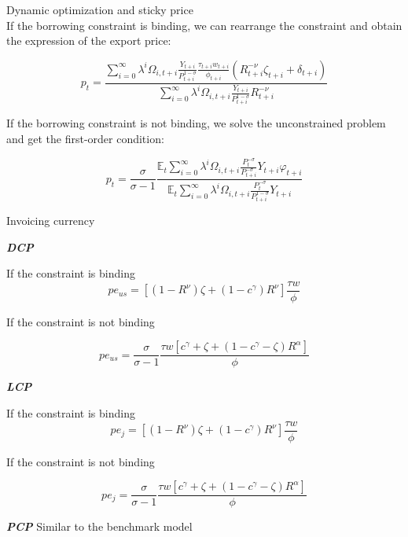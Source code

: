 \documentclass[10pt]{beamer}
\begin{document}
\begin{frame}[label=appendix_model_extension]{Dynamic optimization and sticky price} 
\hyperlink{model_extension}{}\\
If the borrowing constraint is binding, we can rearrange the constraint and obtain the expression of the export price:

\begin{equation}
p_t=\frac{\sum_{i=0}^{\infty} \lambda^i \Omega_{i,t+i}\frac{Y_{t+i}}{P_{t+i}^{1-\sigma}}\frac{\tau_{t+i}w_{t+i}}{\phi_{t+i}}(R_{t+i}^{-\nu}\zeta_{t+i}+\delta_{t+i})}{\sum_{i=0}^{\infty} \lambda^i \Omega_{i,t+i}\frac{Y_{t+i}}{P_{t+i}^{1-\sigma}}R_{t+i}^{-\nu}}
\end{equation}

If the borrowing constraint is not binding, we solve the unconstrained problem and get the first-order condition:

\begin{equation}
p_t=\frac{\sigma}{\sigma-1}\frac{\mathbb{E}_t \sum_{i=0}^{\infty} \lambda^i \Omega_{i,t+i}\frac{P_t^{-\sigma}}{P_{t+i}^{-\sigma}}Y_{t+i}\varphi_{t+i}}{\mathbb{E}_t \sum_{i=0}^{\infty} \lambda^i \Omega_{i,t+i}\frac{P_t^{-\sigma}}{P_{t+i}^{1-\sigma}}Y_{t+i}}
\end{equation}

\end{frame}

\begin{frame}{Invoicing currency}

\textbf{\textit{DCP}}

If the constraint is binding
$$
pe_{us}=[(1-R^{\nu})\zeta+(1-c^\gamma)R^{\nu}] \frac{\tau w}{\phi}
$$

If the constraint is not binding

$$
pe_{us}=\frac{\sigma}{\sigma-1}\frac{\tau w [c^\gamma+\zeta+(1-c^\gamma-\zeta) R^\alpha]}{\phi}
$$

\textbf{\textit{LCP}}

If the constraint is binding
$$
pe_{j}=[(1-R^{\nu})\zeta+(1-c^\gamma)R^{\nu}] \frac{\tau w}{\phi}
$$

If the constraint is not binding

$$
pe_{j}=\frac{\sigma}{\sigma-1}\frac{\tau w [c^\gamma+\zeta+(1-c^\gamma-\zeta) R^\alpha]}{\phi}
$$

\textbf{\textit{PCP}}
Similar to the benchmark model

\end{frame}
\end{document}
